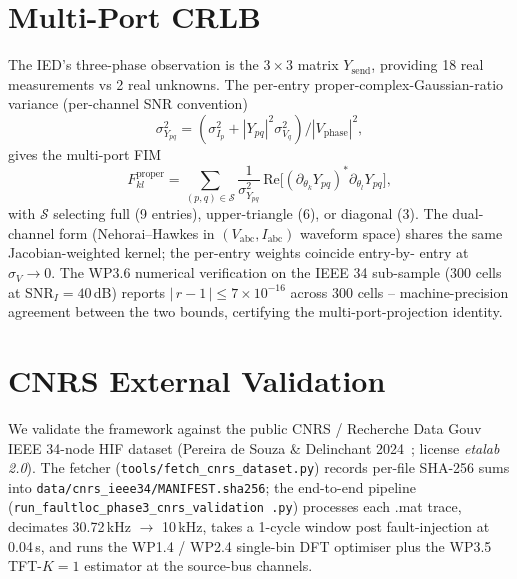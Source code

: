 \documentclass[conference]{IEEEtran}
\newcommand{\headlineKSevenConsist}%
  {$|\,r-1\,| \leq 7\!\times\!10^{-16}$ across 300 cells}
\begin{document}
\section{Multi-Port CRLB}\label{sec:multiport}
The IED's three-phase observation is the $3\!\times\!3$ matrix
$Y_\mathrm{send}$, providing 18 real measurements vs 2 real
unknowns.  The per-entry proper-complex-Gaussian-ratio variance
(per-channel SNR convention)
\begin{equation}
\sigma_{Y_{pq}}^2 = (\sigma_{I_p}^2 + |Y_{pq}|^2 \sigma_{V_q}^2)
                    / |V_\mathrm{phase}|^2,
\label{eq:sigmaYpq}
\end{equation}
gives the multi-port FIM
\begin{equation}
F_{kl}^\mathrm{proper} =
   \sum_{(p,q)\in\mathcal{S}} \frac{1}{\sigma_{Y_{pq}}^2}\,
   \mathrm{Re}\!\bigl[(\partial_{\theta_k} Y_{pq})^*
                       \partial_{\theta_l} Y_{pq}\bigr],
\label{eq:FmultiProper}
\end{equation}
with $\mathcal{S}$ selecting full (9 entries), upper-triangle (6),
or diagonal (3).  The dual-channel form (Nehorai--Hawkes in
$(V_\mathrm{abc}, I_\mathrm{abc})$ waveform space) shares the same
Jacobian-weighted kernel; the per-entry weights coincide entry-by-
entry at $\sigma_V \to 0$.  The WP3.6 numerical verification on
the IEEE 34 sub-sample (300 cells at SNR$_I = 40$\,dB) reports
\headlineKSevenConsist{} -- machine-precision agreement between
the two bounds, certifying the multi-port-projection identity.

\section{CNRS External Validation}\label{sec:cnrs}
We validate the framework against the public CNRS / Recherche Data
Gouv IEEE 34-node HIF dataset (Pereira de Souza \& Delinchant
2024~\cite{PereiraDeSouza2024CNRS}; license \emph{etalab 2.0}).
The fetcher (\texttt{tools/fetch\_cnrs\_dataset.py}) records per-file
SHA-256 sums into \texttt{data/cnrs\_ieee34/MANIFEST.sha256}; the
end-to-end pipeline (\texttt{run\_faultloc\_phase3\_cnrs\_validation
.py}) processes each .mat trace, decimates 30.72\,kHz $\to$
10\,kHz, takes a 1-cycle window post fault-injection at 0.04\,s,
and runs the WP1.4 / WP2.4 single-bin DFT optimiser plus the
WP3.5 TFT-$K=1$ estimator at the source-bus channels.
\end{document}
